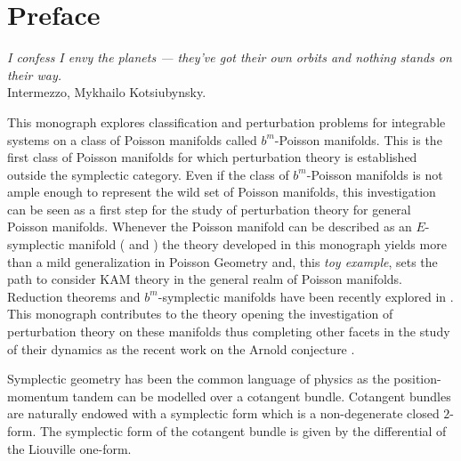 %

\chapter*{Preface}

{\begin{flushright}{\begin{minipage}{5cm}{\emph{I confess I envy the planets — they've got their own orbits and nothing stands on their way.} 
\\
Intermezzo, Mykhailo Kotsiubynsky.}\end{minipage}
}\end{flushright}}



This monograph explores classification and perturbation problems for integrable systems on a class of Poisson manifolds called $b^m$-Poisson manifolds. This is the first class of Poisson manifolds for which perturbation theory is established outside the symplectic category. Even if the class of $b^m$-Poisson manifolds is not ample enough to represent the wild set of Poisson manifolds, this investigation can be seen as a first step for the study of perturbation theory for general Poisson manifolds. Whenever the Poisson manifold can be described as an $E$-symplectic manifold (\cite{enest} and \cite{evageoff}) the theory developed in this monograph yields more than a mild generalization in Poisson Geometry and, this \emph{toy example},  sets the path to consider KAM theory in the general realm of Poisson manifolds. Reduction theorems and $b^m$-symplectic manifolds have been recently explored in \cite{anastasiaeva}. This monograph contributes to the theory opening the investigation of perturbation theory on these manifolds thus completing other facets in the study of their dynamics as the recent work on the Arnold conjecture \cite{cedricjoaquimeva}.

Symplectic geometry has been the common language of physics as the position-momentum tandem can be modelled over a cotangent bundle. Cotangent bundles are naturally endowed with a symplectic form which is a non-degenerate closed $2$-form. The symplectic form of the cotangent bundle is given by the differential of the Liouville one-form.

